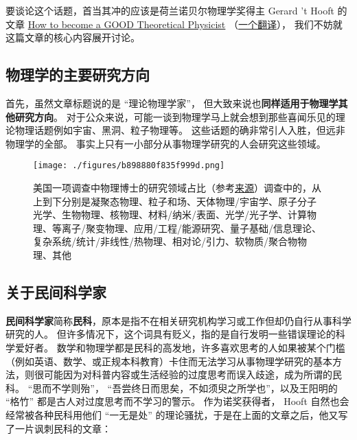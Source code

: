 
要谈论这个话题，首当其冲的应该是荷兰诺贝尔物理学奖得主 Gerard 't Hooft 的文章 \href{https://webspace.science.uu.nl/~hooft101/theorist.html}{How to become a GOOD Theoretical Physicist} （\href{https://xialab.pku.edu.cn/kytdyw1/zdylm.m.jsp?wbtreeid=1011&tstreeid=11956&_t_uid=2945&language=en&homepageuuid=BF649325C5584FC683CE0B601D21AC65&templateuuid=4CC182410BA14FF8B55ED726FB2087FB&producttype=0&_tmode_=99&tsitesapptype=zdylm}{一个翻译}）， 我们不妨就这篇文章的核心内容展开讨论。

\subsection{物理学的主要研究方向}
首先，虽然文章标题说的是 “理论物理学家”， 但大致来说也\textbf{同样适用于物理学其他研究方向}。 对于公众来说，可能一谈到物理学马上就会想到那些喜闻乐见的理论物理话题例如宇宙、黑洞、粒子物理等。 这些话题的确非常引人入胜，但远非物理学的全部。 事实上只有一小部分从事物理学研究的人会研究这些领域。

\begin{figure}[ht]
\centering
\texttt{[image: ./figures/b898880f835f999d.png]}
\caption{美国一项调查中物理博士的研究领域占比（参考\href{https://ww2.aip.org/statistics/trends-in-physics-phds}{来源}）调查中的，从上到下分别是凝聚态物理、粒子和场、天体物理/宇宙学、原子分子光学、生物物理、核物理、材料/纳米/表面、光学/光子学、计算物理、等离子/聚变物理、应用/工程/能源研究、量子基础/信息理论、复杂系统/统计/非线性/热物理、相对论/引力、软物质/聚合物物理、其他} \label{fig_SdyPhy_1}
\end{figure}

\subsection{关于民间科学家}
\textbf{民间科学家}简称\textbf{民科}，原本是指不在相关研究机构学习或工作但却仍自行从事科学研究的人。 但许多情况下，这个词具有贬义，指的是自行发明一些错误理论的科学爱好者。 数学和物理学都是民科的高发地，许多喜欢思考的人如果被某个门槛（例如英语、数学、或正规本科教育）卡住而无法学习从事物理学研究的基本方法，则很可能因为对科普内容或生活经验的过度思考而误入歧途，成为所谓的民科。 “思而不学则殆”， “吾尝终日而思矣，不如须臾之所学也”，以及王阳明的 “格竹” 都是古人对过度思考而不学习的警示。 作为诺奖获得者， Hooft 自然也会经常被各种民科用他们 “一无是处” 的理论骚扰，于是在上面的文章之后，他又写了一片讽刺民科的文章：

